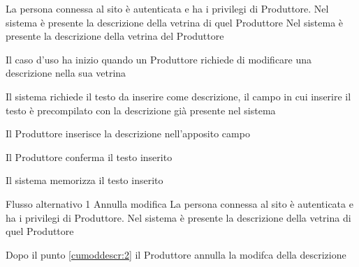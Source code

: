 \tabcuvspace

{}
{La persona connessa al sito è autenticata e ha i privilegi di Produttore. Nel sistema è presente la descrizione della vetrina di quel Produttore}
{Nel sistema è presente la descrizione della vetrina del Produttore}
{\begin{enumCU}
		\item Il caso d'uso ha inizio quando un Produttore richiede di modificare una descrizione nella sua vetrina
		\item Il sistema richiede il testo da inserire come descrizione, il campo in cui inserire il testo è precompilato con la descrizione già presente nel sistema 
		\item Il Produttore inserisce la descrizione nell'apposito campo \label{cumoddescr:2}
		\item Il Produttore conferma il testo inserito
		\item Il sistema memorizza il testo inserito
	\end{enumCU}}
%
{Flusso alternativo 1}%
{Annulla modifica}%
{La persona connessa al sito è autenticata e ha i privilegi di Produttore. Nel sistema è presente la descrizione della vetrina di quel Produttore}%
{\postNulle}%
{\begin{enumCU}
		\item Dopo il punto \ref{cumoddescr:2} il Produttore annulla la modifca della descrizione
	\end{enumCU}}%

\tabcuvspace

